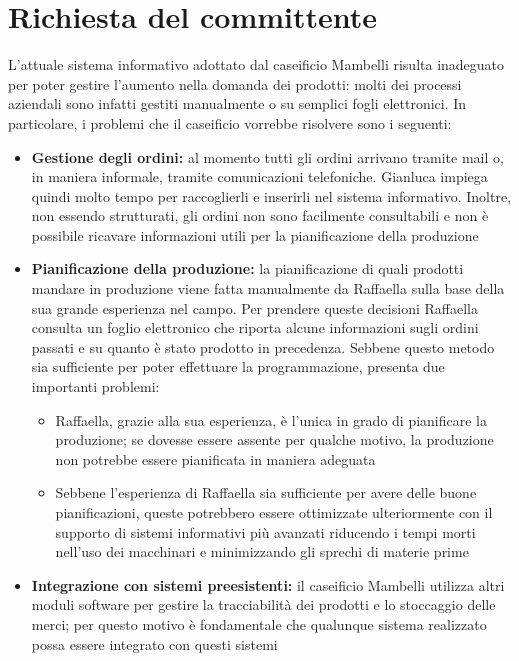 \section{Richiesta del committente}\label{sec:richiesta-del-committente}
L'attuale sistema informativo adottato dal caseificio Mambelli risulta inadeguato per poter gestire l'aumento nella domanda dei prodotti: molti dei processi aziendali sono infatti gestiti manualmente o su semplici fogli elettronici. In particolare, i problemi che il caseificio vorrebbe risolvere sono i seguenti:
\begin{itemize}
  \item \textbf{Gestione degli ordini:} al momento tutti gli ordini arrivano tramite mail o, in maniera informale, tramite comunicazioni telefoniche. Gianluca impiega quindi molto tempo per raccoglierli e inserirli nel sistema informativo. Inoltre, non essendo strutturati, gli ordini non sono facilmente consultabili e non è possibile ricavare informazioni utili per la pianificazione della produzione
  \item \textbf{Pianificazione della produzione:} la pianificazione di quali prodotti mandare in produzione viene fatta manualmente da Raffaella sulla base della sua grande esperienza nel campo. Per prendere queste decisioni Raffaella consulta un foglio elettronico che riporta alcune informazioni sugli ordini passati e su quanto è stato prodotto in precedenza. Sebbene questo metodo sia sufficiente per poter effettuare la programmazione, presenta due importanti problemi:
        \begin{itemize}
          \item Raffaella, grazie alla sua esperienza, è l'unica in grado di pianificare la produzione; se dovesse essere assente per qualche motivo, la produzione non potrebbe essere pianificata in maniera adeguata
          \item Sebbene l'esperienza di Raffaella sia sufficiente per avere delle buone pianificazioni, queste potrebbero essere ottimizzate ulteriormente con il supporto di sistemi informativi più avanzati riducendo i tempi morti nell'uso dei macchinari e minimizzando gli sprechi di materie prime
        \end{itemize}
  \item \textbf{Integrazione con sistemi preesistenti:} il caseificio Mambelli utilizza altri moduli software per gestire la tracciabilità dei prodotti e lo stoccaggio delle merci; per questo motivo è fondamentale che qualunque sistema realizzato possa essere integrato con questi sistemi
\end{itemize}

